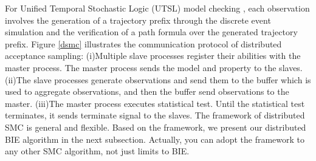 \begin{figure}[htbp]
\end{figure}

For Unified Temporal Stochastic Logic (UTSL) model checking \cite{Younes2004Planning}, each observation involves the generation of a trajectory prefix through the discrete event simulation and the verification of a path formula over the generated trajectory prefix. Figure \ref{dsmc} illustrates the communication protocol of distributed acceptance sampling: (i)Multiple slave processes register their abilities with the master process. The master process sends the model and property to the slaves. (ii)The slave processes generate observations and send them to the buffer which is used to aggregate observations, and then the buffer send observations to the master. (iii)The master process executes statistical test. Until the statistical test terminates, it sends terminate signal to the slaves. The framework of distributed SMC is general and flexible. Based on the framework, we present our distributed BIE algorithm in the next subsection. Actually, you can adopt the framework to any other SMC algorithm, not just limits to BIE.

